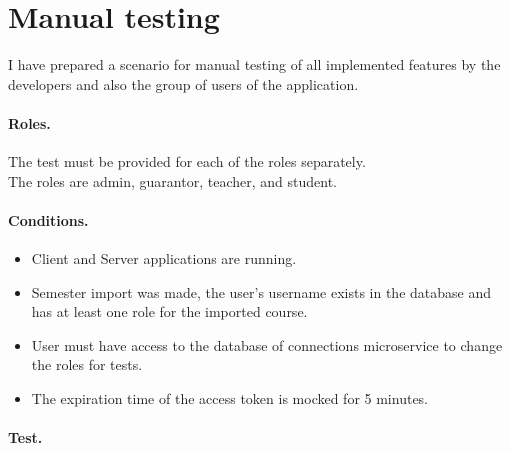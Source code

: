 \section{Manual testing} I have prepared a scenario for manual testing of all implemented features by the developers and also the group of users of the application. 

\paragraph*{Roles.} The test must be provided for each of the roles separately. \\
The roles are admin, guarantor, teacher, and student.

\paragraph*{Conditions.} 
\begin{itemize}
    \item  Client and Server applications are running.
    \item  Semester import was made, the user's username exists in the database and has at least one role for the imported course.
    \item  User must have access to the database of connections microservice to change the roles for tests.
    \item  The expiration time of the access token is mocked for 5 minutes.
\end{itemize}

\paragraph*{Test.} \

